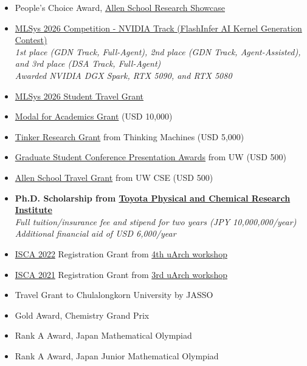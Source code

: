 \documentclass[10pt]{extarticle}
\begin{document}

\begin{itemize}
    \item People's Choice Award, \href{https://www.cs.washington.edu/community-engagement/industry-affiliates/research-showcase/}{Allen School Research Showcase} 
    \item \href{https://mlsys26.flashinfer.ai/}{MLSys 2026 Competition - NVIDIA Track (FlashInfer AI Kernel Generation Contest)} \\
    {\it 1st place (GDN Track, Full-Agent), 2nd place (GDN Track, Agent-Assisted), and 3rd place (DSA Track, Full-Agent)}\\
    {\it Awarded NVIDIA DGX Spark, RTX 5090, and RTX 5080}
    \item \href{https://mlsys.org/Conferences/2026/CallForTravelGrants}{MLSys 2026 Student Travel Grant} 
    \item \href{https://modal.com/academics}{Modal for Academics Grant} (USD 10,000) 
    \item \href{https://thinkingmachines.ai/blog/tinker-research-and-teaching-grants/}{Tinker Research Grant} from Thinking Machines (USD 5,000) 
    \item \href{https://grad.uw.edu/funding_posts/graduate-student-conference-presentation-awards/}{Graduate Student Conference Presentation Awards} from UW (USD 500) 
    \item \href{https://www.cs.washington.edu/academics/graduate/phd-program/handbook/funding-fellowships/travel-grants/}{Allen School Travel Grant} from UW CSE (USD 500) 
    \item{\bf Ph.D. Scholarship from \href{https://www.toyotariken.jp/en/}{Toyota Physical and Chemical Research Institute}}\\
    {\it Full tuition/insurance fee and stipend for two years (JPY 10,000,000/year)} \\
    {\it Additional financial aid of USD 6,000/year} 
    \item \href{https://iscaconf.org/isca2022/}{ISCA 2022} Registration Grant from \href{https://sites.google.com/wisc.edu/uarch2022/}{4th uArch workshop} 
    \item \href{https://iscaconf.org/isca2021/}{ISCA 2021} Registration Grant from \href{https://sites.google.com/wisc.edu/uarch2021/}{3rd uArch workshop} 
    \item Travel Grant to Chulalongkorn University by JASSO 
    \item Gold Award, Chemistry Grand Prix
    \item Rank A Award, Japan Mathematical Olympiad
    \item Rank A Award, Japan Junior Mathematical Olympiad
\end{itemize}
\end{document}
